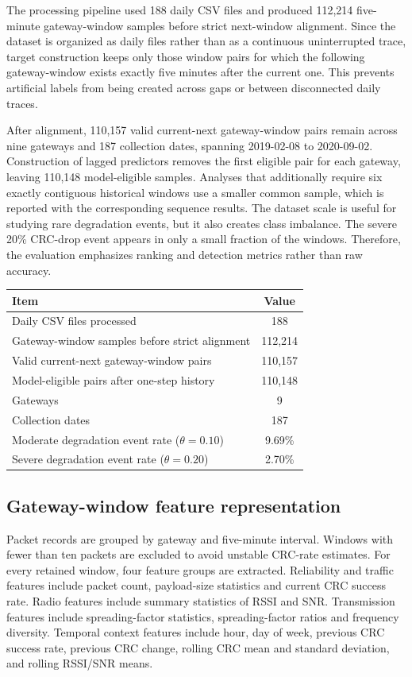 \documentclass{jot}
\begin{document}
The processing pipeline used 188 daily CSV files and produced 112,214 five-minute gateway-window samples before strict next-window alignment. Since the dataset is organized as daily files rather than as a continuous uninterrupted trace, target construction keeps only those window pairs for which the following gateway-window exists exactly five minutes after the current one. This prevents artificial labels from being created across gaps or between disconnected daily traces.

After alignment, 110,157 valid current-next gateway-window pairs remain across nine gateways and 187 collection dates, spanning 2019-02-08 to 2020-09-02. Construction of lagged predictors removes the first eligible pair for each gateway, leaving 110,148 model-eligible samples. Analyses that additionally require six exactly contiguous historical windows use a smaller common sample, which is reported with the corresponding sequence results. The dataset scale is useful for studying rare degradation events, but it also creates class imbalance. The severe 20\% CRC-drop event appears in only a small fraction of the windows. Therefore, the evaluation emphasizes ranking and detection metrics rather than raw accuracy.

\begin{table}[t]
\centering
\begin{tabular}{@{}lc@{}}
\toprule
Item & Value \\
\midrule
Daily CSV files processed & 188 \\
Gateway-window samples before strict alignment & 112,214 \\
Valid current-next gateway-window pairs & 110,157 \\
Model-eligible pairs after one-step history & 110,148 \\
Gateways & 9 \\
Collection dates & 187 \\
Moderate degradation event rate ($\theta = 0.10$) & 9.69\% \\
Severe degradation event rate ($\theta = 0.20$) & 2.70\% \\
\bottomrule
\end{tabular}
\end{table}

\subsection{Gateway-window feature representation}\label{s:3.2}
Packet records are grouped by gateway and five-minute interval. Windows with fewer than ten packets are excluded to avoid unstable CRC-rate estimates. For every retained window, four feature groups are extracted. Reliability and traffic features include packet count, payload-size statistics and current CRC success rate. Radio features include summary statistics of RSSI and SNR. Transmission features include spreading-factor statistics, spreading-factor ratios and frequency diversity. Temporal context features include hour, day of week, previous CRC success rate, previous CRC change, rolling CRC mean and standard deviation, and rolling RSSI/SNR means.
\end{document}
